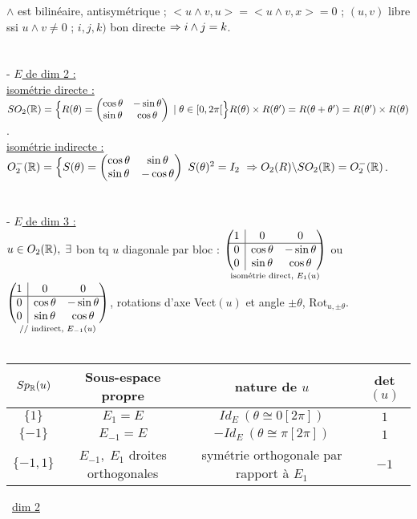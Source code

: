 \documentclass[12 pt]{book}
\begin{document}
$\land$ est bilinéaire, antisymétrique ; $<u\land v,u> = <u\land v,x>=0$ ; $(u,v)$ libre ssi $u\land v \neq 0$ ; $i,j,k)$ bon directe $\Rightarrow i\land j =k$.\\
\text{}\\
\text{}\\
- \underline{$E$ de dim 2 :}\\
\underline{isométrie directe :} $SO_2(\mathbb{R}) = \Big\{ R(\theta) = \begin{pmatrix} \cos \theta & -\sin \theta \\
\sin \theta & \cos \theta\end{pmatrix} \; | \; \theta\in [0,2\pi[ \Big\} \\ R(\theta)\times R(\theta') = R(\theta + \theta') = R(\theta')\times R(\theta)$.\\
\underline{isométrie indirecte :} $ O_2^-(\mathbb{R}) = \Big\{ S(\theta) = \begin{pmatrix} \cos \theta & \sin \theta \\
\sin \theta & -\cos \theta\end{pmatrix} \ S(\theta)^2 = I_2 \ \Rightarrow O_2(R)\backslash SO_2(\mathbb{R}) = O_2^-(\mathbb{R})$.\\
\text{}\\
\text{}\\
- \underline{$E$ de dim 3 :}\\
$u\in O_2(\mathbb{R}), \; \exists$ bon tq $u$ diagonale par bloc : $\underset{\text{isométrie direct, } E_1(u)}{\begin{pmatrix} 1 &\rvline & 0 & 0\\\hline 0 &\rvline& \cos \theta & -\sin \theta \\ 0 &\rvline &\sin \theta & \cos \theta\end{pmatrix}}$ ou $\underset{\text{// indirect, }E_{-1}(u)}{\begin{pmatrix} 1 &\rvline & 0 & 0\\\hline 0 &\rvline& \cos \theta & -\sin \theta \\ 0 &\rvline &\sin \theta & \cos \theta\end{pmatrix}}$, rotations d'axe Vect$(u)$ et angle $\pm\theta$, $\text{Rot}_{u, \pm\theta}$.\\
\text{}\\
\begin{tabular}{|c|c|c|c|}
\hline
     $Sp_{\mathbb{R}}(u)$ & Sous-espace propre & nature de $u$ & det$(u)$ \\\hline
     $\{1\}$ & $E_1 =E$ & $Id_E \ (\theta \cong 0[2\pi])$ & $1$\\\hline
     $\{-1\}$ & $E_{-1}=E$ & $-Id_E \ (\theta \cong \pi[2\pi])$ & $1$\\\hline
     $\{-1,1\}$ & $E_{-1}, \; E_1$ droites orthogonales & symétrie orthogonale par rapport à $E_1$ & $-1$\\\hline
\end{tabular} \ \underline{dim 2}\\
\end{document}
